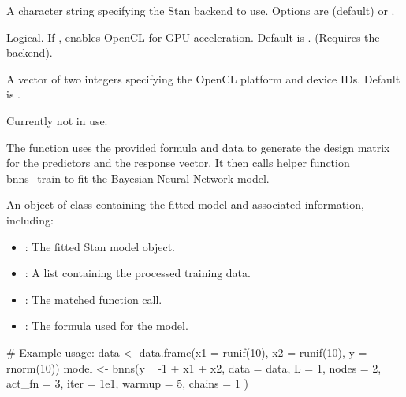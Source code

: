 \documentclass[a4paper]{book}
\begin{document}
\begin{Arguments}
\begin{ldescription}
\item[\code{backend}] A character string specifying the Stan backend to use. Options are  (default) or .

\item[\code{use\_gpu}] Logical. If , enables OpenCL for GPU acceleration. Default is . (Requires the  backend).

\item[\code{opencl\_ids}] A vector of two integers specifying the OpenCL platform and device IDs. Default is .

\item[\code{...}] Currently not in use.
\end{ldescription}
\end{Arguments}
%
\begin{Details}
The function uses the provided formula and data to generate the design matrix for the predictors and the response vector. It then calls helper function bnns\_train to fit the Bayesian Neural Network model.
\end{Details}
%
\begin{Value}
An object of class  containing the fitted model and associated information, including:
\begin{itemize}

\item{} : The fitted Stan model object.
\item{} : A list containing the processed training data.
\item{} : The matched function call.
\item{} : The formula used for the model.

\end{itemize}

\end{Value}
%
\begin{Examples}
\begin{ExampleCode}

# Example usage:
data <- data.frame(x1 = runif(10), x2 = runif(10), y = rnorm(10))
model <- bnns(y ~ -1 + x1 + x2,
  data = data, L = 1, nodes = 2, act_fn = 3,
  iter = 1e1, warmup = 5, chains = 1
)

\end{ExampleCode}
\end{Examples}
\end{document}
